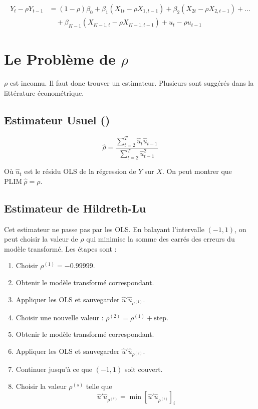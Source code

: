 \documentclass[14pt]{extarticle} %
\theoremstyle{definition}
\theoremstyle{plain}
\begin{document}
\begin{align}
Y_t - \rho Y_{t-1} &= (1 - \rho) \beta_0 + \beta_1 (X_{1t} - \rho X_{1,t-1}) + \beta_2 (X_{2t} - \rho X_{2,t-1}) + \dots \nonumber \\
&\quad + \beta_{K-1} (X_{K-1,t} - \rho X_{K-1,t-1}) + u_t - \rho u_{t-1} \label{eq:cochran_orcutt}
\end{align}

\section{Le Problème de $\rho$}

$\rho$ est inconnu. Il faut donc trouver un estimateur. Plusieurs sont suggérés dans la littérature économétrique.

\subsection{Estimateur Usuel (\textcolor{blue}{\cite{gujarati2010}})}

\[
\hat{\rho} = \frac{\sum_{t=2}^{T} \hat{u}_t \hat{u}_{t-1}}{\sum_{t=2}^{T} \hat{u}_{t-1}^2}
\]

Où $\hat{u}_t$ est le résidu OLS de la régression de $Y$ sur $X$. On peut montrer que $\text{PLIM} \ \hat{\rho} = \rho$.

\subsection{Estimateur de Hildreth-Lu}

Cet estimateur ne passe pas par les OLS. En balayant l’intervalle $(-1, 1)$, on peut choisir la valeur de $\rho$ qui minimise la somme des carrés des erreurs du modèle transformé. Les étapes sont :

\begin{enumerate}
    \item Choisir $\rho^{(1)} = -0.99999$.
    \item Obtenir le modèle transformé correspondant.
    \item Appliquer les OLS et sauvegarder $\hat{u}'\hat{u}_{\rho^{(1)}}$.
    \item Choisir une nouvelle valeur : $\rho^{(2)} = \rho^{(1)} + \text{step}$.
    \item Obtenir le modèle transformé correspondant.
    \item Appliquer les OLS et sauvegarder $\hat{u}'\hat{u}_{\rho^{(2)}}$.
    \item Continuer jusqu’à ce que $(-1, 1)$ soit couvert.
    \item Choisir la valeur $\rho^{(s)}$ telle que
    \[
    \hat{u}'\hat{u}_{\rho^{(s)}} = \min \left[ \hat{u}'\hat{u}_{\rho^{(i)}} \right]_i
    \]
\end{enumerate}
\end{document}
